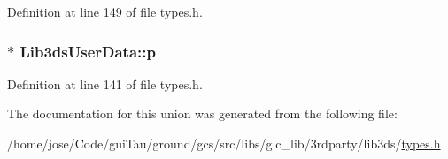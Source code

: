 Definition at line 149 of file types.\-h.

\hypertarget{union_lib3ds_user_data_a1663b685f1eca998dbc71de58c357e30}{
\subsubsection[{p}]{$\ast$ Lib3ds\-User\-Data\-::p}}\label{union_lib3ds_user_data_a1663b685f1eca998dbc71de58c357e30}


Definition at line 141 of file types.\-h.



The documentation for this union was generated from the following file\-:\begin{DoxyCompactItemize}
\item 
/home/jose/\-Code/gui\-Tau/ground/gcs/src/libs/glc\-\_\-lib/3rdparty/lib3ds/\hyperlink{types_8h}{types.\-h}\end{DoxyCompactItemize}
